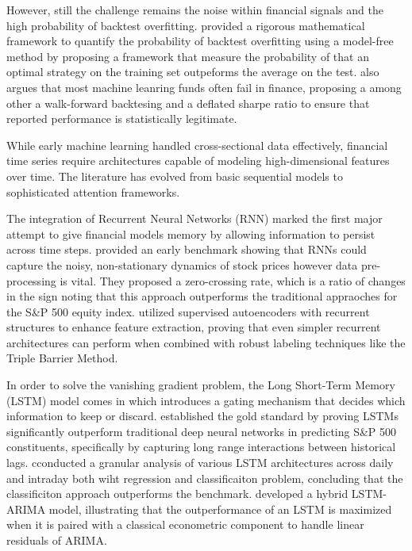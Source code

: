 \documentclass[]{elsarticle}
\begin{document}
However, still the challenge remains the noise within financial signals and the high probability of backtest overfitting. \citet{Bailey2014} provided a rigorous mathematical framework to quantify the probability of backtest overfitting using a model-free method by proposing a framework that measure the probability of that an optimal strategy on the training set outpeforms the average on the test. \citet{LopezDePrado2018} also argues that most machine leanring funds often fail in finance, proposing a among other a walk-forward backtesing and a deflated sharpe ratio to ensure that reported performance is statistically legitimate.

While early machine learning handled cross-sectional data effectively, financial time series require architectures capable of modeling high-dimensional features over time. The literature has evolved from basic sequential models to sophisticated attention frameworks.

The integration of Recurrent Neural Networks (RNN) marked the first major attempt to give financial models memory by allowing information to persist across time steps. \citet{Giles2001} provided an early benchmark showing that RNNs could capture the noisy, non-stationary dynamics of stock prices however data pre-processing is vital. They proposed a zero-crossing rate, which is a ratio of changes in the sign noting that this approach outperforms the traditional appraoches for the S\&P 500 equity index. \citet{Bieganowski_Slepaczuk_2024}  utilized supervised autoencoders with recurrent structures to enhance feature extraction, proving that even simpler recurrent architectures can perform when combined with robust labeling techniques like the Triple Barrier Method.

In order to solve the vanishing gradient problem, the Long Short-Term Memory (LSTM) model comes in which introduces a gating mechanism that decides which information to keep or discard. \citet{Fischer2018} established the gold standard by proving LSTMs significantly outperform traditional deep neural networks in predicting S\&P 500 constituents, specifically by capturing long range interactions between historical lags. \citet{Krynska_Slepaczuk_2022} cconducted a granular analysis of various LSTM architectures across daily and intraday both wiht regression and classificaiton problem, concluding that the classificiton approach outperforms the benchmark. \citet{Kashif_Slepaczuk_2024} developed a hybrid LSTM-ARIMA model, illustrating that the outperformance of an LSTM is maximized when it is paired with a classical econometric component to handle linear residuals of ARIMA.
\end{document}

